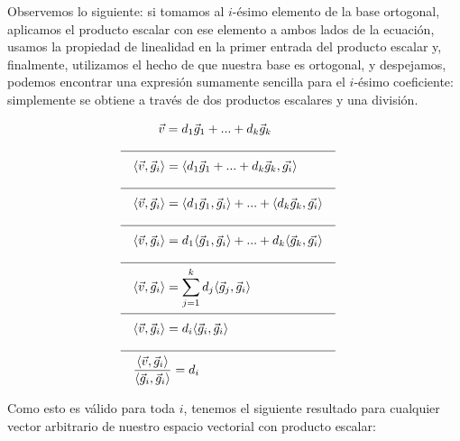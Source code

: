 \documentclass[12pt,dvipsnames]{article}
\numberwithin{equation}{section}
\begin{document}
Observemos lo siguiente: si tomamos al $i$-ésimo elemento de la base ortogonal, aplicamos el producto escalar con ese elemento a ambos lados de la ecuación, usamos la propiedad de linealidad en la primer entrada del producto escalar y, finalmente, utilizamos el hecho de que nuestra base es ortogonal, y despejamos, podemos encontrar una expresión sumamente sencilla para el $i$-ésimo coeficiente: simplemente se obtiene a través de dos productos escalares y una división.

\begin{align*}
    & & & \quad \quad \vec{v}= d_1\vec{g}_1 + ... + d_k\vec{g}_k& & & \\
    \cline{1-8}
    & & &\langle \vec{v} , \vec{g}_i \rangle = \langle d_1\vec{g}_1 + ... + d_k\vec{g}_k , \vec{g_i} \rangle& & & \\
    \cline{1-8}
    & & &\langle \vec{v} , \vec{g}_i \rangle = \langle d_1\vec{g}_1,\vec{g}_i\rangle + ... + \langle d_k\vec{g}_k , \vec{g_i} \rangle& & & \\
    \cline{1-8}
    & & &\langle \vec{v} , \vec{g}_i \rangle = d_1\langle \vec{g}_1, \vec{g}_i\rangle + ... + d_k\langle \vec{g}_k , \vec{g_i} \rangle& & & \\
    \cline{1-8}
    & & &\langle \vec{v} , \vec{g}_i \rangle = \sum_{j=1}^k d_j\langle \vec{g}_j, \vec{g}_i\rangle& & & \\
    \cline{1-8}
    & & &\langle \vec{v} , \vec{g}_i \rangle = d_i \langle\vec{g}_i, \vec{g}_i\rangle& & & \\
    \cline{1-8}
    & & &\frac{\langle \vec{v} ,\vec{g}_i \rangle}{\langle\vec{g}_i, \vec{g}_i\rangle} = d_i& & &
\end{align*}

Como esto es válido para toda $i$, tenemos el siguiente resultado para cualquier vector arbitrario de nuestro espacio vectorial con producto escalar:
\end{document}
